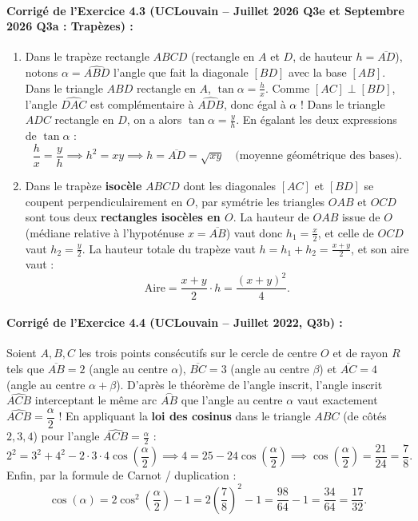 \paragraph{Corrigé de l'Exercice 4.3 (UCLouvain -- Juillet 2026 Q3e et Septembre 2026 Q3a : Trapèzes) :}
\begin{enumerate}[label=(\alph*)]
    \item Dans le trapèze rectangle $ABCD$ (rectangle en $A$ et $D$, de hauteur $h = \overline{AD}$), notons $\alpha = \widehat{ABD}$ l'angle que fait la diagonale $[BD]$ avec la base $[AB]$. Dans le triangle $ABD$ rectangle en $A$, $\tan\alpha = \frac{h}{x}$. Comme $[AC] \perp [BD]$, l'angle $\widehat{DAC}$ est complémentaire à $\widehat{ADB}$, donc égal à $\alpha$ ! Dans le triangle $ADC$ rectangle en $D$, on a alors $\tan\alpha = \frac{y}{h}$. En égalant les deux expressions de $\tan\alpha$ :
    \[
        \frac{h}{x} = \frac{y}{h} \implies h^2 = xy \implies \boxed{h = \overline{AD} = \sqrt{xy}} \quad \text{(moyenne géométrique des bases)}.
    \]
    \item Dans le trapèze \textbf{isocèle} $ABCD$ dont les diagonales $[AC]$ et $[BD]$ se coupent perpendiculairement en $O$, par symétrie les triangles $OAB$ et $OCD$ sont tous deux \textbf{rectangles isocèles en $O$}. La hauteur de $OAB$ issue de $O$ (médiane relative à l'hypoténuse $x = \overline{AB}$) vaut donc $h_1 = \frac{x}{2}$, et celle de $OCD$ vaut $h_2 = \frac{y}{2}$. La hauteur totale du trapèze vaut $h = h_1 + h_2 = \frac{x+y}{2}$, et son aire vaut :
    \[
        \text{Aire} = \frac{x+y}{2} \cdot h = \boxed{\frac{(x+y)^2}{4}}.
    \]
\end{enumerate}

\paragraph{Corrigé de l'Exercice 4.4 (UCLouvain -- Juillet 2022, Q3b) :}
Soient $A, B, C$ les trois points consécutifs sur le cercle de centre $O$ et de rayon $R$ tels que $\overline{AB} = 2$ (angle au centre $\alpha$), $\overline{BC} = 3$ (angle au centre $\beta$) et $\overline{AC} = 4$ (angle au centre $\alpha+\beta$). D'après le théorème de l'angle inscrit, l'angle inscrit $\widehat{ACB}$ interceptant le même arc $\overset{\frown}{AB}$ que l'angle au centre $\alpha$ vaut exactement $\widehat{ACB} = \dfrac{\alpha}{2}$ !
En appliquant la \textbf{loi des cosinus} dans le triangle $ABC$ (de côtés $2, 3, 4$) pour l'angle $\widehat{ACB} = \frac{\alpha}{2}$ :
\[
    2^2 = 3^2 + 4^2 - 2\cdot 3\cdot 4\cos\left(\frac{\alpha}{2}\right) \implies 4 = 25 - 24\cos\left(\frac{\alpha}{2}\right) \implies \cos\left(\frac{\alpha}{2}\right) = \frac{21}{24} = \frac{7}{8}.
\]
Enfin, par la formule de Carnot / duplication :
\[
    \cos(\alpha) = 2\cos^2\left(\frac{\alpha}{2}\right) - 1 = 2\left(\frac{7}{8}\right)^2 - 1 = \frac{98}{64} - 1 = \frac{34}{64} = \boxed{\frac{17}{32}}.
\]

